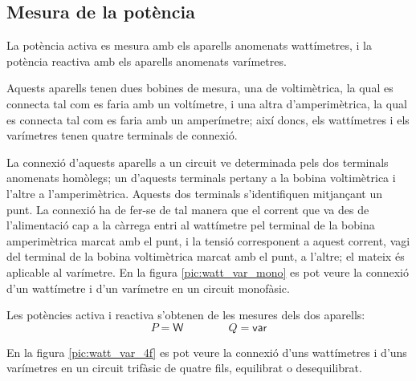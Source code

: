 \subsection{Mesura de la potència}

La potència activa es mesura amb els aparells anomenats wattímetres,
i la potència reactiva amb els aparells anomenats varímetres.

Aquests aparells tenen dues bobines de mesura, una de voltimètrica,
la qual es connecta tal com es faria amb un voltímetre, i una altra
d'amperimètrica, la qual es connecta tal com es faria amb un
amperímetre; així doncs, els wattímetres i els varímetres tenen
quatre terminals de connexió.

La connexió d'aquests aparells a un circuit ve determinada pels dos terminals
anomenats homòlegs; un d'aquests terminals pertany a la bobina
voltimètrica i l'altre a l'amperimètrica. Aquests dos terminals s'identifiquen mitjançant un punt. La connexió
ha de fer-se de tal manera que el corrent que va des de
l'alimentació cap a la càrrega entri al wattímetre pel terminal de
la bobina amperimètrica marcat amb el punt, i la tensió corresponent
a aquest corrent, vagi del terminal de la bobina voltimètrica marcat
amb el punt, a l'altre; el mateix és aplicable al
varímetre. En la figura \vref{pic:watt_var_mono} es pot veure la connexió d'un wattímetre i d'un varímetre en un circuit monofàsic.


\begin{center}
    
    \label{pic:watt_var_mono}
\end{center}

Les potències activa i reactiva s'obtenen de les mesures dels dos
aparells:
\begin{equation}
    P = \textsf{W} \qquad\qquad Q = \textsf{var}
\end{equation}

En la figura \vref{pic:watt_var_4f} es pot veure la connexió d'uns
wattímetres i d'uns varímetres en un circuit trifàsic de quatre fils,
equilibrat o desequilibrat.

\begin{center}
    
    \label{pic:watt_var_4f}
\end{center}

